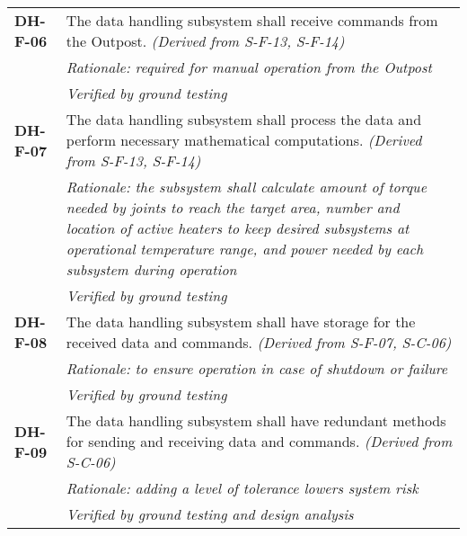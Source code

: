 \begin{longtable}{P{2cm}P{13.25cm}}
\textbf{DH-F-06}	& The data handling subsystem shall receive commands from the Outpost. 
\textit{(Derived from S-F-13, S-F-14)}\\
& \textit{Rationale: required for manual operation from the Outpost} \\
& \textit{Verified by ground testing}	\\

\textbf{DH-F-07}	& The data handling subsystem shall process the data and perform necessary mathematical computations. 
\textit{(Derived from S-F-13, S-F-14)}\\
& \textit{Rationale: the subsystem shall calculate amount of torque needed by joints to reach the target area, number and location of active heaters to keep desired subsystems at operational temperature range, and power needed by each subsystem during operation} \\
& \textit{Verified by ground testing}	\\

\textbf{DH-F-08}	& The data handling subsystem shall have storage for the received data and commands. \textit{(Derived from S-F-07, S-C-06)} \\
 &	\textit{Rationale: to ensure operation in case of shutdown or failure} \\
& \textit{Verified by ground testing}	\\
\textbf{DH-F-09}	& The data handling subsystem shall have redundant methods for sending and receiving data and commands. \textit{(Derived from S-C-06)} \\
 &	\textit{Rationale: adding a level of tolerance lowers system risk} \\
 &	\textit{Verified by ground testing and design analysis}
\end{longtable}
\vspace{-15pt}
